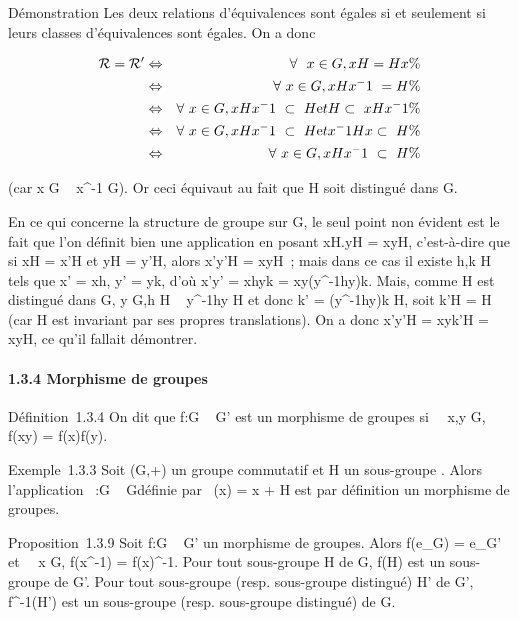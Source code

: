 Démonstration Les deux relations d'équivalences sont égales si et
seulement si leurs classes d'équivalences sont égales. On a donc

\begin{align*} \mathcal{R} = \mathcal{R}'& \Leftrightarrow
& \forall~~x \in G, xH = Hx \%&
\\ & \Leftrightarrow &
\forall~x \in G, xHx^-1~ = H \%&
\\ & \Leftrightarrow &
\forall~x \in G, xHx^-1~ \subset~
H\text et H \subset~ xHx^-1\%&
\\ & \Leftrightarrow &
\forall~x \in G, xHx^-1~ \subset~
H\text et x^-1Hx \subset~ H\%&
\\ & \Leftrightarrow &
\forall~x \in G, xHx^-1~ \subset~ H \%&
\\ \end{align*}

(car x \in G \rigtharrow~ x^-1 \in G). Or ceci équivaut au fait que H soit
distingué dans G.

En ce qui concerne la structure de groupe sur G\diagupH, le seul point non
évident est le fait que l'on définit bien une application en posant
xH.yH = xyH, c'est-à-dire que si xH = x'H et yH = y'H, alors x'y'H =
xyH~; mais dans ce cas il existe h,k \in H tels que x' = xh, y' = yk, d'où
x'y' = xhyk = xy(y^-1hy)k. Mais, comme H est distingué dans
G, y \in G,h \in H \rigtharrow~ y^-1hy \in H et donc k' = (y^-1hy)k
\in H, soit k'H = H (car H est invariant par ses propres translations). On
a donc x'y'H = xyk'H = xyH, ce qu'il fallait démontrer.

\paragraph{1.3.4 Morphisme de groupes}

Définition~1.3.4 On dit que f:G \rightarrow~ G' est un morphisme de groupes si
\forall~~x,y \in G, f(xy) = f(x)f(y).

Exemple~1.3.3 Soit (G,+) un groupe commutatif et H un sous-groupe .
Alors l'application \pi~:G \rightarrow~ G\diagupH définie par \pi~(x) = x + H est par
définition un morphisme de groupes.

Proposition~1.3.9 Soit f:G \rightarrow~ G' un morphisme de groupes. Alors
f(e_G) = e_G' et \forall~~x \in G,
f(x^-1) = f(x)^-1. Pour tout sous-groupe H de G,
f(H) est un sous-groupe de G'. Pour tout sous-groupe (resp. sous-groupe
distingué) H' de G', f^-1(H') est un sous-groupe (resp.
sous-groupe distingué) de G.

